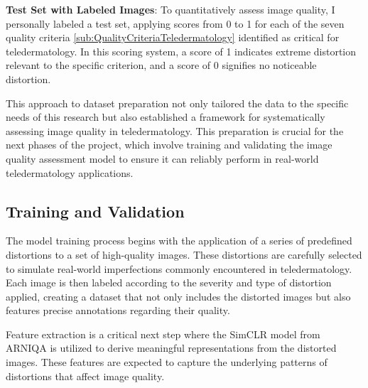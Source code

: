 \noindent
\textbf{Test Set with Labeled Images}: To quantitatively assess image quality, I personally labeled a test set, applying scores from 0 to 1 for each of the seven quality criteria \autoref{sub:QualityCriteriaTeledermatology} identified as critical for teledermatology. In this scoring system, a score of 1 indicates extreme distortion relevant to the specific criterion, and a score of 0 signifies no noticeable distortion.
\par
\vspace{\baselineskip}
\noindent
This approach to dataset preparation not only tailored the data to the specific needs of this research but also established a framework for systematically assessing image quality in teledermatology. This preparation is crucial for the next phases of the project, which involve training and validating the image quality assessment model to ensure it can reliably perform in real-world teledermatology applications. \par


\subsection{Training and Validation}
\label{sub:TrainVal}
The model training process begins with the application of a series of predefined distortions to a set of high-quality images. These distortions are carefully selected to simulate real-world imperfections commonly encountered in teledermatology. Each image is then labeled according to the severity and type of distortion applied, creating a dataset that not only includes the distorted images but also features precise annotations regarding their quality.
\par
\vspace{\baselineskip}
\noindent
Feature extraction is a critical next step where the SimCLR model from ARNIQA is utilized to derive meaningful representations from the distorted images. These features are expected to capture the underlying patterns of distortions that affect image quality. \par

